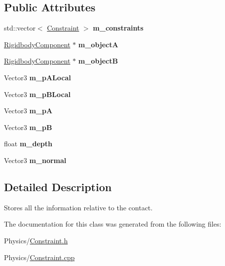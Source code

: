 \subsection*{Public Attributes}
\begin{DoxyCompactItemize}
\item 
\mbox{\label{classContact_a5db355d00ddb18ce037309fb6cbc9500}} 
std\+::vector$<$ \hyperlink{classConstraint}{Constraint} $>$ {\bfseries m\+\_\+constraints}
\item 
\mbox{\label{classContact_a9380549ad60a64820bb6ed0a3caf4e97}} 
\hyperlink{classRigidbodyComponent}{Rigidbody\+Component} $\ast$ {\bfseries m\+\_\+objectA}
\item 
\mbox{\label{classContact_a9f1e0f5aa29a630f107040c33961066a}} 
\hyperlink{classRigidbodyComponent}{Rigidbody\+Component} $\ast$ {\bfseries m\+\_\+objectB}
\item 
\mbox{\label{classContact_a6d0ef9e980ba29be6929f5aa62047f17}} 
Vector3 {\bfseries m\+\_\+p\+A\+Local}
\item 
\mbox{\label{classContact_a9d86be919bd954292afec22b844a2800}} 
Vector3 {\bfseries m\+\_\+p\+B\+Local}
\item 
\mbox{\label{classContact_a50c33e277ddeb3bd1f6ab69ee91e00e7}} 
Vector3 {\bfseries m\+\_\+pA}
\item 
\mbox{\label{classContact_a29ab504566025807593cc61f9348695a}} 
Vector3 {\bfseries m\+\_\+pB}
\item 
\mbox{\label{classContact_a351480a3ed43b421ee758c3c8ec33e2c}} 
float {\bfseries m\+\_\+depth}
\item 
\mbox{\label{classContact_af92b4be8a55d8655e0e3264d5f83f40c}} 
Vector3 {\bfseries m\+\_\+normal}
\end{DoxyCompactItemize}


\subsection{Detailed Description}
Stores all the information relative to the contact. 

The documentation for this class was generated from the following files\+:\begin{DoxyCompactItemize}
\item 
Physics/\hyperlink{Constraint_8h}{Constraint.\+h}\item 
Physics/\hyperlink{Constraint_8cpp}{Constraint.\+cpp}\end{DoxyCompactItemize}
